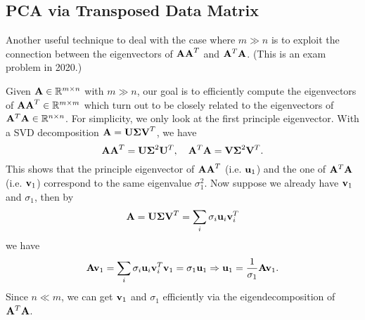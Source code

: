 \documentclass[../main.tex]{subfiles}
\begin{document}
\subsection{PCA via Transposed Data Matrix}
Another useful technique to deal with the case where $m\gg n$ is to exploit the connection between the eigenvectors of ${\bf AA}^T$ and ${\bf A}^T{\bf A}$. (This is an exam problem in 2020.) 
\par Given ${\bf A}\in \mathbb{R}^{m\times n}$ with $m\gg n$, our goal is to efficiently compute the eigenvectors of ${\bf AA}^T\in \mathbb{R}^{m\times m}$ which turn out to be closely related to the eigenvectors of ${\bf A}^T{\bf A}\in \mathbb{R}^{n\times n}$. For simplicity, we only look at the first principle eigenvector. With a SVD decomposition ${\bf A}={\bf U\Sigma V}^T$, we have
\begin{equation*}
	{\bf AA}^T = {\bf U\Sigma }^2{\bf U}^T,\quad {\bf A}^T{\bf A} ={\bf V\Sigma }^2{\bf V}^T.
\end{equation*}
This shows that the principle eigenvector of ${\bf AA}^T$ (i.e. ${\bf u}_1$) and the one of ${\bf A}^T{\bf A}$ (i.e. ${\bf v}_1$) correspond to the same eigenvalue $\sigma_1^2$. Now suppose we already have ${\bf v}_1$ and $\sigma_1$, then by
\begin{equation*}
	{\bf A}={\bf U\Sigma V}^T = \sum_i \sigma_i {\bf u}_i{\bf v}_i^T
\end{equation*}
we have
\begin{equation*}
	{\bf Av}_1 = \sum_i \sigma_i {\bf u}_i{\bf v}_i^T{\bf v}_1 =\sigma_1 {\bf u}_1 \Rightarrow {\bf u}_1 =\frac{1}{\sigma_1}{\bf Av}_1.
\end{equation*}
Since $n\ll m$, we can get ${\bf v}_1$ and $\sigma_1$ efficiently via the eigendecomposition of ${\bf A}^T{\bf A}$.
\end{document}
